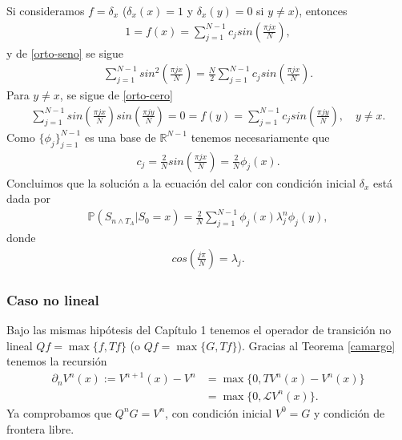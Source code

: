 \documentclass{article}
\numberwithin{equation}{section}
\begin{document}
Si consideramos $f = \delta_x$ ($\delta_x(x) = 1$ y $\delta_x(y) = 0$ si $y \not = x$), entonces
\begin{align*}
    1 = f(x) =  \sum_{j=1}^{N-1}c_jsin\left(\frac{\pi jx}{N}\right),
\end{align*}
y de \eqref{orto-seno} se sigue
\begin{align*}
\sum_{j=1}^{N-1}sin^2\left(\frac{\pi j x}{N}\right) = \frac{N}{2}\sum_{j=1}^{N-1}c_jsin\left(\frac{\pi jx}{N}\right). 
\end{align*}
Para $y \not = x$, se sigue de \eqref{orto-cero}
\begin{align*}
    \sum_{j=1}^{N-1}sin\left(\frac{\pi jx}{N}\right) sin\left(\frac{\pi jy}{N}\right) = 0 = f(y) =  \sum_{j=1}^{N-1}c_jsin\left(\frac{\pi jy}{N}\right), \quad y \not = x.
\end{align*}
Como $\{\phi_j\}_{j=1}^{N-1}$ es una base de $\mathbb{R}^{N-1}$ tenemos necesariamente que
\begin{align*}
    c_j = \frac{2}{N}sin\left(\frac{\pi jx}{N}\right) = \frac{2}{N}\phi_j(x).
\end{align*}
Concluimos que la solución a la ecuación del calor con condición inicial $\delta_x$ está dada por
\begin{align*}
    \mathbb{P}\left(S_{n\land T_A} | S_0 = x\right) = \frac{2}{N}\sum_{j=1}^{N-1}\phi_j(x)\lambda_j^n\phi_j(y),
\end{align*}
donde
\begin{align*}
    cos\left(\frac{j\pi}{N}\right) = \lambda_j.
\end{align*}

\subsubsection{Caso no lineal}

Bajo las mismas hipótesis del Capítulo 1 tenemos el operador de transición no lineal $Qf = \max\{f,Tf\}$ (o $Qf = \max\{G,Tf\}$). Gracias al Teorema \ref{camargo} tenemos la recursión 
\begin{align}
    \partial_nV^n(x) := V^{n+1}(x) - V^{n} &= \max\{0,TV^{n}(x) - V^{n}(x)\}\\ &= \max\{0,\mathcal{L}V^{n}(x)\}.
\end{align}
Ya comprobamos que $Q^nG = V^n$, con condición inicial $V^0 = G$ y condición de frontera libre.


 
\end{document}
